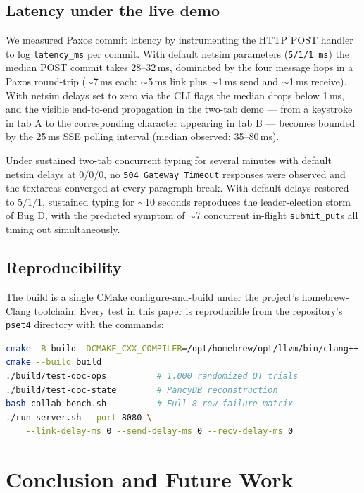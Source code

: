\documentclass[11pt]{article}
\newcommand{\code}[1]{\texttt{#1}}
\begin{document}
\subsection{Latency under the live demo}

We measured Paxos commit latency by instrumenting the HTTP POST handler to log \code{latency\_ms} per commit. With default netsim parameters (\code{5/1/1\,ms}) the median POST commit takes 28--32\,ms, dominated by the four message hops in a Paxos round-trip ($\sim$7\,ms each: $\sim$5\,ms link plus $\sim$1\,ms send and $\sim$1\,ms receive). With netsim delays set to zero via the CLI flags the median drops below 1\,ms, and the visible end-to-end propagation in the two-tab demo --- from a keystroke in tab A to the corresponding character appearing in tab B --- becomes bounded by the 25\,ms SSE polling interval (median observed: 35--80\,ms).

Under sustained two-tab concurrent typing for several minutes with default netsim delays at $0/0/0$, no \code{504 Gateway Timeout} responses were observed and the textareas converged at every paragraph break. With default delays restored to $5/1/1$, sustained typing for $\sim$10 seconds reproduces the leader-election storm of Bug D, with the predicted symptom of $\sim$7 concurrent in-flight \code{submit\_put}s all timing out simultaneously.

\subsection{Reproducibility}

The build is a single CMake configure-and-build under the project's homebrew-Clang toolchain. Every test in this paper is reproducible from the repository's \code{pset4} directory with the commands:
\begin{lstlisting}[language=bash]
cmake -B build -DCMAKE_CXX_COMPILER=/opt/homebrew/opt/llvm/bin/clang++
cmake --build build
./build/test-doc-ops          # 1.000 randomized OT trials
./build/test-doc-state        # PancyDB reconstruction
bash collab-bench.sh          # Full 8-row failure matrix
./run-server.sh --port 8080 \
    --link-delay-ms 0 --send-delay-ms 0 --recv-delay-ms 0
\end{lstlisting}

\section{Conclusion and Future Work}
\end{document}
